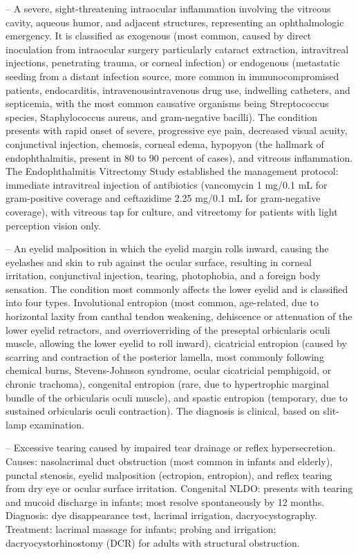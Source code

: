 -- A severe, sight-threatening intraocular inflammation involving the vitreous cavity, aqueous humor, and adjacent structures, representing an ophthalmologic emergency. It is classified as exogenous (most common, caused by direct inoculation from intraocular surgery particularly cataract extraction, intravitreal injections, penetrating trauma, or corneal infection) or endogenous (metastatic seeding from a distant infection source, more common in immunocompromised patients, endocarditis, intravenousintravenous drug use, indwelling catheters, and septicemia, with the most common causative organisms being Streptococcus species, Staphylococcus aureus, and gram-negative bacilli). The condition presents with rapid onset of severe, progressive eye pain, decreased visual acuity, conjunctival injection, chemosis, corneal edema, hypopyon (the hallmark of endophthalmitis, present in 80 to 90 percent of cases), and vitreous inflammation. The Endophthalmitis Vitrectomy Study established the management protocol: immediate intravitreal injection of antibiotics (vancomycin 1 mg/0.1 mL for gram-positive coverage and ceftazidime 2.25 mg/0.1 mL for gram-negative coverage), with vitreous tap for culture, and vitrectomy for patients with light perception vision only.

-- An eyelid malposition in which the eyelid margin rolls inward, causing the eyelashes and skin to rub against the ocular surface, resulting in corneal irritation, conjunctival injection, tearing, photophobia, and a foreign body sensation. The condition most commonly affects the lower eyelid and is classified into four types. Involutional entropion (most common, age-related, due to horizontal laxity from canthal tendon weakening, dehiscence or attenuation of the lower eyelid retractors, and overrioverriding of the preseptal orbicularis oculi muscle, allowing the lower eyelid to roll inward), cicatricial entropion (caused by scarring and contraction of the posterior lamella, most commonly following chemical burns, Stevens-Johnson syndrome, ocular cicatricial pemphigoid, or chronic trachoma), congenital entropion (rare, due to hypertrophic marginal bundle of the orbicularis oculi muscle), and spastic entropion (temporary, due to sustained orbicularis oculi contraction). The diagnosis is clinical, based on slit-lamp examination.

-- Excessive tearing caused by impaired tear drainage or reflex hypersecretion. Causes: nasolacrimal duct obstruction (most common in infants and elderly), punctal stenosis, eyelid malposition (ectropion, entropion), and reflex tearing from dry eye or ocular surface irritation. Congenital NLDO: presents with tearing and mucoid discharge in infants; most resolve spontaneously by 12 months. Diagnosis: dye disappearance test, lacrimal irrigation, dacryocystography. Treatment: lacrimal massage for infants; probing and irrigation; dacryocystorhinostomy (DCR) for adults with structural obstruction.

